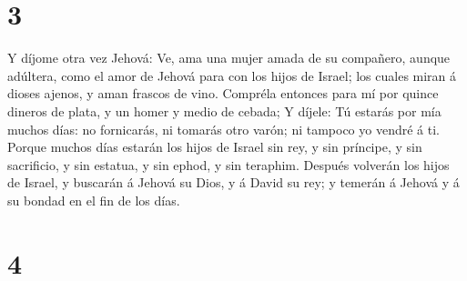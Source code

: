 \hypertarget{section-2}{%
\section{3}\label{section-2}}

 Y díjome otra vez Jehová: Ve, ama una mujer amada de su
compañero, aunque adúltera, como el amor de Jehová para con los hijos de
Israel; los cuales miran á dioses ajenos, y aman frascos de vino.
 Compréla entonces para mí por quince dineros de plata, y
un homer y medio de cebada;  Y díjele: Tú estarás por mía
muchos días: no fornicarás, ni tomarás otro varón; ni tampoco yo vendré
á ti.  Porque muchos días estarán los hijos de Israel sin
rey, y sin príncipe, y sin sacrificio, y sin estatua, y sin ephod, y sin
teraphim.  Después volverán los hijos de Israel, y
buscarán á Jehová su Dios, y á David su rey; y temerán á Jehová y á su
bondad en el fin de los días.

\hypertarget{section-3}{%
\section{4}\label{section-3}}


